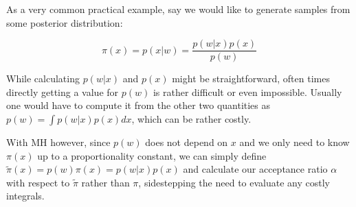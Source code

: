 As a very common practical example, say we would like to generate samples from some posterior distribution:

\begin{equation*}
\pi(x) = p(x | w) = \frac{p(w | x) p(x)}{p(w)}
\end{equation*}

While calculating $p(w | x)$ and $p(x)$ might be straightforward, often times directly getting a value for $p(w)$ is rather difficult or even impossible. Usually one would have to compute it from the other two quantities as $p(w) = \int p(w | x) p(x) dx$, which can be rather costly.

With MH however, since $p(w)$ does not depend on $x$ and we only need to know $\pi(x)$ up to a proportionality constant, we can simply define $\tilde{\pi}(x) = p(w) \pi(x) = p(w | x) p(x)$ and calculate our acceptance ratio $\alpha$ with respect to $\tilde{\pi}$ rather than $\pi$, sidestepping the need to evaluate any costly integrals.